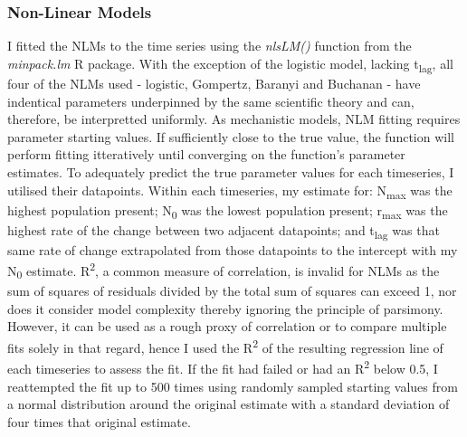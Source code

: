 \documentclass[11pt]{article}
\begin{document}
\subsubsection{Non-Linear Models}
I fitted the NLMs to the time series using the \textit{nlsLM()} function from the \textit{minpack.lm} R package. With the exception of the logistic model, lacking t\textsubscript{lag}, all four of the NLMs used - logistic, Gompertz, Baranyi and Buchanan - have indentical parameters underpinned by the same scientific theory and can, therefore, be interpretted uniformly.\parencite{Odenbaugh2006}
As mechanistic models, NLM fitting requires parameter starting values. If sufficiently close to the true value, the function will perform fitting itteratively until converging on the function's parameter estimates. To adequately predict the true parameter values for each timeseries, I utilised their datapoints. Within each timeseries, my estimate for: N\textsubscript{max} was the highest population present; N\textsubscript{0} was the lowest population present; r\textsubscript{max} was the highest rate of the change between two adjacent datapoints; and t\textsubscript{lag} was that same rate of change extrapolated from those datapoints to the intercept with my N\textsubscript{0} estimate.\parencite{Micha2011}
R\textsuperscript{2}, a common measure of correlation, is invalid for NLMs as the sum of squares of residuals divided by the total sum of squares can exceed 1, nor does it consider model complexity thereby ignoring the principle of parsimony.\parencite{Johnson2004} However, it can be used as a rough proxy of correlation or to compare multiple fits solely in that regard, hence I used the R\textsuperscript{2} of the resulting regression line of each timeseries to assess the fit. If the fit had failed or had an R\textsuperscript{2} below 0.5, I reattempted the fit up to 500 times using randomly sampled starting values from a normal distribution around the original estimate with a standard deviation of four times that original estimate.
\end{document}
